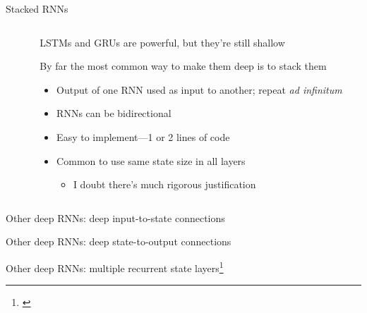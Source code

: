 \begin{frame}{Stacked RNNs}
    \begin{columns}
        \begin{column}{0.457\textwidth}
            
        \end{column}
        \begin{column}{0.543\textwidth}
            LSTMs and GRUs are powerful, but they're still shallow

            \begin{block}{}
                By far the most common way to make them deep is to \alert{stack} them
            \end{block}

            \begin{itemize}
                \item Output of one RNN used as input to another; repeat \emph{ad infinitum}
                \pause
                \item RNNs can be bidirectional
                \item Easy to implement---1 or 2 lines of code
                \item Common to use same state size in all layers
                \begin{itemize}
                    \item I doubt there's much rigorous justification
                \end{itemize}
            \end{itemize}
        \end{column}
    \end{columns}
\end{frame}

\begin{frame}{Other deep RNNs: deep input-to-state connections}
    
\end{frame}

\begin{frame}{Other deep RNNs: deep state-to-output connections}
    \vspace{-2.8mm}
    
\end{frame}

\setcounter{footnote}{0}

\begin{frame}{Other deep RNNs: multiple recurrent state layers\footnote{\citet{GravesICASSP13}}}
    \vspace{1.6mm}
    
\end{frame}

